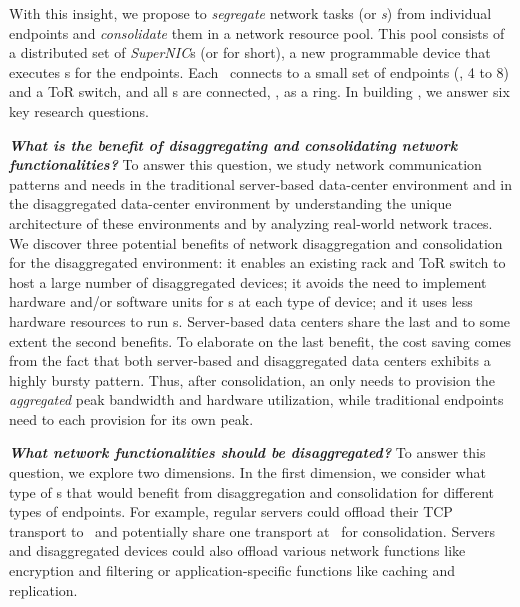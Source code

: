 With this insight, we propose to \textit{segregate} network tasks (or {\em \nt{}s}) from individual endpoints and \textit{consolidate} them in a network resource pool.
This pool consists of a distributed set of \textit{SuperNIC}s (or \textit{\snic} for short), a new programmable device that executes \nt{}s for the endpoints.
Each \snic\ connects to a small set of endpoints (\eg, 4 to 8) and a ToR switch,
and all \snic{}s are connected, \eg, as a ring.
In building \snic, we answer six key research questions.

\vspace{0.05in}
\noindent \textbf{\textit{What is the benefit of disaggregating and consolidating network functionalities?}} 
To answer this question, we study network communication patterns and needs in the traditional server-based data-center environment and in the disaggregated data-center environment by understanding the unique architecture of these environments and by analyzing real-world network traces.
We discover three potential benefits of network disaggregation and consolidation for the disaggregated environment: it enables an existing rack and ToR switch to host a large number of disaggregated devices; it avoids the need to implement hardware and/or software units for \nt{}s at each type of device; and it uses less hardware resources to run \nt{}s.
Server-based data centers share the last and to some extent the second benefits.
To elaborate on the last benefit, the cost saving comes from the fact that both server-based and disaggregated data centers exhibits a highly bursty pattern.
Thus, after consolidation, an \snic{} only needs to provision the \textit{aggregated} peak bandwidth and hardware utilization,
while traditional endpoints need to each provision for its own peak.


\vspace{0.05in}
\noindent \textbf{\textit{What network functionalities should be disaggregated?}}
To answer this question, we explore two dimensions.
In the first dimension, we consider what type of \nt{}s that would benefit from disaggregation and consolidation for different types of endpoints. 
For example, regular servers could offload their TCP transport to \snic\ and potentially share one transport at \snic\ for consolidation.
Servers and disaggregated devices could also offload various network functions like encryption and filtering or application-specific functions like caching and replication.

